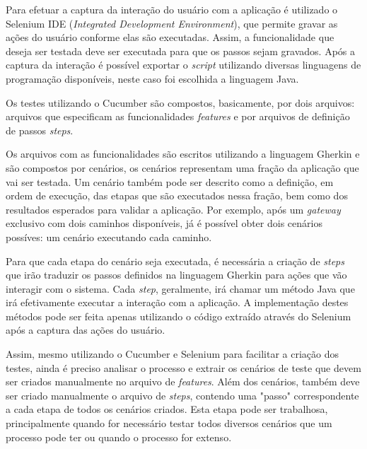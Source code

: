 \documentclass[12pt]{article}
\begin{document}
Para efetuar a captura da interação do usuário com a aplicação é utilizado o Selenium IDE (\emph{Integrated Development Environment}), que permite gravar as ações do usuário conforme elas são executadas. Assim, a funcionalidade que deseja ser testada deve ser executada para que os passos sejam gravados. Após a captura da interação é possível exportar o \emph{script} utilizando diversas linguagens de programação disponíveis, neste caso foi escolhida a linguagem Java.

Os testes utilizando o Cucumber são compostos, basicamente, por dois arquivos: arquivos que especificam as funcionalidades \emph{features} e por arquivos de definição de passos \emph{steps}. 

Os arquivos com as funcionalidades são escritos utilizando a linguagem Gherkin\cite{gherkin} e são compostos por cenários, os cenários representam uma fração da aplicação que vai ser testada. Um cenário também pode ser descrito como a definição, em ordem de execução, das etapas que são executados nessa fração, bem como dos resultados esperados para validar a aplicação. Por exemplo, após um \emph{gateway} exclusivo com dois caminhos disponíveis, já é possível obter dois cenários possíves: um cenário executando cada caminho.

Para que cada etapa do cenário seja executada, é necessária a criação de \emph{steps} que irão traduzir os passos definidos na linguagem Gherkin para ações que vão interagir com o sistema. Cada \emph{step}, geralmente, irá chamar um método Java que irá efetivamente executar a interação com a aplicação. A implementação destes métodos pode ser feita apenas utilizando o código extraído através do Selenium após a captura das ações do usuário.

Assim, mesmo utilizando o Cucumber e Selenium para facilitar a criação dos testes, ainda é preciso analisar o processo e extrair os cenários de teste que devem ser criados manualmente no arquivo de \emph{features}. Além dos cenários, também deve ser criado manualmente o arquivo de \emph{steps}, contendo uma "passo" correspondente a cada etapa de todos os cenários criados. Esta etapa pode ser trabalhosa, principalmente quando for necessário testar todos diversos cenários que um processo pode ter ou quando o processo for extenso.
\end{document}
